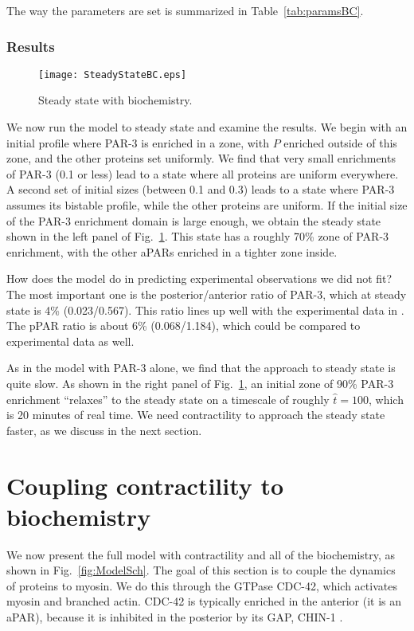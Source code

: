 \documentclass[11pt]{article}
\newcommand{\6}[1]{#1_{\text{6}}}
\newcommand{\3}[1]{#1_{\text{3}}}
\begin{document}
The way the parameters are set is summarized in Table\ \ref{tab:paramsBC}.

\subsubsection{Results}
\begin{figure}
\centering
\texttt{[image: SteadyStateBC.eps]}
\caption{\label{fig:BCSS}Steady state with biochemistry.}
\end{figure}

We now run the model to steady state and examine the results. We begin with an initial profile where PAR-3 is enriched in a zone, with $P$ enriched outside of this zone, and the other proteins set uniformly. We find that very small enrichments of PAR-3 (0.1 or less) lead to a state where all proteins are uniform everywhere. A second set of initial sizes (between 0.1 and 0.3) leads to a state where PAR-3 assumes its bistable profile, while the other proteins are uniform. If the initial size of the PAR-3 enrichment domain is large enough, we obtain the steady state shown in the left panel of Fig.\ \ref{fig:BCSS}. This state has a roughly 70\% zone of PAR-3 enrichment, with the other aPARs enriched in a tighter zone inside. 

How does the model do in predicting experimental observations we did not fit? The most important one is the posterior/anterior ratio of PAR-3, which at steady state is 4\% (0.023/0.567). This ratio lines up well with the experimental data in \cite[Fig.~4C]{sailer2015dynamic}. The pPAR ratio is about 6\% (0.068/1.184), which could be compared to experimental data as well.

As in the model with PAR-3 alone, we find that the approach to steady state is quite slow. As shown in the right panel of Fig.\ \ref{fig:BCSS}, an initial zone of 90\% PAR-3 enrichment ``relaxes'' to the steady state on a timescale of roughly $\hat t = 100$, which is 20 minutes of real time. We need contractility to approach the steady state faster, as we discuss in the next section.

\section{Coupling contractility to biochemistry \label{sec:WithMy}}
We now present the full model with contractility and all of the biochemistry, as shown in Fig.~\ref{fig:ModelSch}. The goal of this section is to couple the dynamics of proteins to myosin. We do this through the GTPase CDC-42, which activates myosin and branched actin. CDC-42 is typically enriched in the anterior (it is an aPAR), because it is inhibited in the posterior by its GAP, CHIN-1 \cite{sailer2015dynamic}. 
\end{document}

